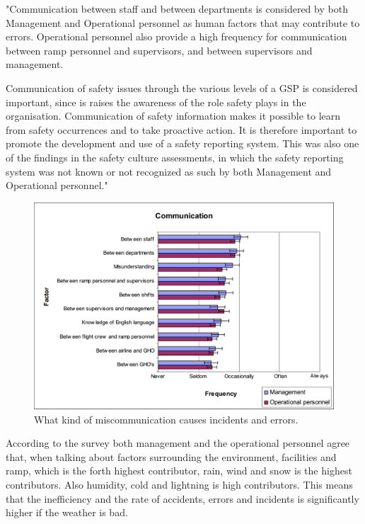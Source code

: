 "Communication between staff and between departments is considered by both Management and Operational personnel as human factors that may contribute to errors. Operational personnel also provide a high frequency for communication between ramp personnel and supervisors, and between supervisors and management. 

Communication of safety issues through the various levels of a GSP is considered important, since is raises the awareness of the role safety plays in the organisation. Communication of safety information makes it possible to learn from safety occurrences and to take proactive action. It is therefore important to promote the development and use of a safety reporting system. This was also one of the findings in the safety culture assessments, in which the safety reporting system was not known or not recognized as such by both Management and Operational personnel."

\begin{figure}[!h]
\centering
\includegraphics[width=\textwidth]{Grafik/CommunicationalFactors}
\caption{What kind of miscommunication causes incidents and errors.}
\label{CommunicationalFactors}
\end{figure}

According to the survey both management and the operational personnel agree that, when talking about factors surrounding the environment, facilities and ramp, which is the forth highest contributor, rain, wind and snow is the highest contributors. Also humidity, cold and lightning is high contributors. This means that the inefficiency and the rate of accidents, errors and incidents is significantly higher if the weather is bad.

